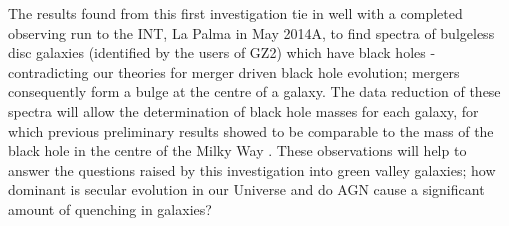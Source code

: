 \documentclass{mn2e}
\begin{document}
The results found from this first investigation tie in well with a completed observing run to the INT, La Palma in May 2014A, to find spectra of bulgeless disc galaxies (identified by the users of GZ2) which have black holes - contradicting our theories for merger driven black hole evolution; mergers consequently form a bulge at the centre of a galaxy. The data reduction of these spectra will allow the determination of black hole masses for each galaxy, for which previous preliminary results showed to be comparable to the mass of the black hole in the centre of the Milky Way \citep{Simmons13}. These observations will help to answer the questions raised by this investigation into green valley galaxies; how dominant is secular evolution in our Universe and do AGN cause a significant amount of quenching in galaxies?

%
%
%
\end{document}
